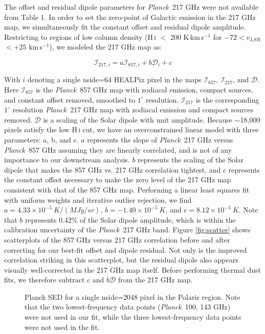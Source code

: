 \documentclass{emulateapj}
\newcommand{\PLANCK}{{\it Planck}}
\begin{document}
The offset and residual dipole parameters for \PLANCK~217 GHz were not 
available from \cite{planckdust} Table 1. In order to set the zero-point of 
Galactic emission in the 217 GHz map, we simultaneously fit the constant 
offset and residual dipole amplitude. Restricting to regions of low column 
density (H\,\textsc{i} $<$ 200 K\,km\,s$^{-1}$ for $-72$$<$$v_{LSR}$$<$$+25$ 
km\,s$^{-1}$), we modeled the 217 GHz map as:

\begin{equation}
\mathcal{I}_{217, i} = a\mathcal{I}_{857, i} + b\mathcal{D}_{i} + c
\end{equation}

With $i$ denoting a single nside=64 HEALPix pixel in the maps 
$\mathcal{I}_{857}$, $\mathcal{I}_{217}$, and $\mathcal{D}$. Here 
$\mathcal{I}_{857}$ is the \PLANCK~857 GHz map with zodiacal emission, compact 
sources, and constant offset removed, smoothed to $1^{\circ}$ resolution. 
$\mathcal{I}_{217}$ is the corresponding $1^{\circ}$ resolution \PLANCK~217 
GHz map with zodiacal emission and compact sources removed. $\mathcal{D}$ is a
scaling of the Solar dipole with unit amplitude. Because $\sim$18,000 pixels
satisfy the low H\,\textsc{i} cut, we have an overconstrained linear model with
three parameters: a, b, and c. $a$ represents the slope of \PLANCK~217 GHz 
versus \PLANCK~857 GHz assuming they are linearly correlated, and is not
of any importance to our downstream analysis. $b$ represents the scaling of 
the Solar dipole that makes the 857 GHz vs. 217 GHz correlation tightest, and 
$c$ represents the constant offset necessary to make the zero level of the 217 
GHz map consistent with that of the 857 GHz map. Performing a linear least
squares fit with uniform weights and iterative outlier rejection, we find 
$a=4.33\times10^{-5}\ K/(MJy/sr)$, $b=-1.40\times10^{-5}\ K$, and 
$c=8.12\times10^{-5}\ K$. Note that $b$ represents 0.42\% of the Solar dipole 
amplitude, which is within the calibration uncertainty of the \PLANCK~217 GHz 
band. Figure \ref{fig:scatter} shows scatterplots of the 857 GHz versus 217 
GHz correlation before and after correcting for our best-fit offset and dipole 
residual. Not only is the improved correlation striking in this scatterplot, 
but the residual dipole also appears visually well-corrected in the 217 GHz 
map itself. Before performing thermal dust fits, we therefore subtract $c$ and 
$b\mathcal{D}$ from the 217 GHz map.

\begin{figure}
\begin{center}
\caption{\label{fig:sed} Planck SED for a single nside=2048 pixel in the 
Polaris region. Note that the two lowest-frequency data points (\PLANCK~100, 
143 GHz) were not used in our fit, while the three lowest-frequency data
points were not used in the \cite{planckdust} fit.}
\end{center}
\end{figure}
\end{document}
